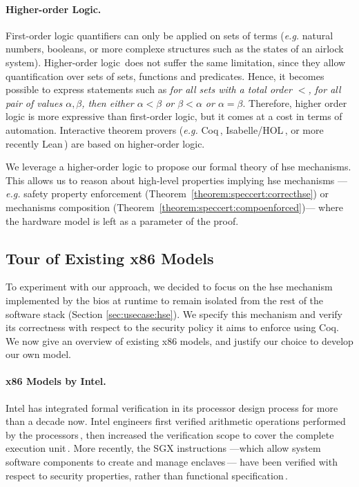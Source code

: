 \paragraph{Higher-order Logic.}
%
First-order logic quantifiers can only be applied on sets of terms (\emph{e.g.}
natural numbers, booleans, or more complexe structures such as the states of an
airlock system).
%
Higher-order logic\,\cite{leivant1994hol} does not suffer the same limitation,
since they allow quantification over sets of sets, functions and predicates.
%
Hence, it becomes possible to express statements such as \emph{for all sets with
  a total order \( < \), for all pair of values \( \alpha, \beta \), then either
  \( \alpha < \beta \) or \( \beta < \alpha \) or \( \alpha = \beta \)}.
%
Therefore, higher order logic is more expressive than first-order logic, but it
comes at a cost in terms of automation.
%
Interactive theorem provers (\emph{e.g.}  Coq\,\cite{coq},
Isabelle/HOL\,\cite{nipkow2002isabelle}, or more recently
Lean\,\cite{de2015lean}) are based on higher-order logic.

We leverage a higher-order logic to propose our formal theory of \ac{hse}
mechanisms.
%
This allows us to reason about high-level properties implying \ac{hse}
mechanisms ---\emph{e.g.} safety property enforcement
(Theorem~\ref{theorem:speccert:correcthse}) or mechanisms composition
(Theorem~\ref{theorem:speccert:compoenforced})--- where the hardware model is
left as a parameter of the proof.

\subsection{Tour of Existing x86 Models}
\label{subsec:sota:ltsrelated}

To experiment with our approach, we decided to focus on the \ac{hse} mechanism
implemented by the \ac{bios} at runtime to remain isolated from the rest of the
software stack (Section \ref{sec:usecase:hse}). We specify this mechanism and
verify its correctness with respect to the security policy it aims to enforce
using Coq.
%
We now give an overview of existing x86 models, and justify our choice to
develop our own model.

\paragraph{x86 Models by Intel.}
%
Intel has integrated formal verification in its processor design process for
more than a decade now.
%
Intel engineers first verified arithmetic operations performed by the
processors\,\cite{harrison2000x86}, then increased the verification scope to
cover the complete execution unit\,\cite{kaivola2009formalintel}.
%
More recently, the SGX instructions ---which allow system software components to
create and manage enclaves\,\cite{costan2016sgxexplained}--- have been verified
with respect to security properties, rather than functional
specification\,\cite{leslie2015linsgx}.
%

